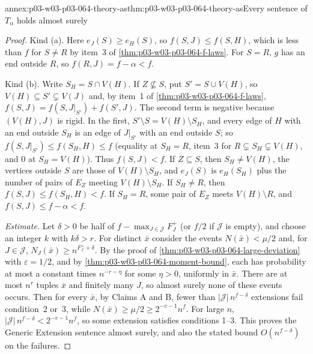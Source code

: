 \begin{annexitem}{annex:p03-w03-p03-064-theory-as}{thm:p03-w03-p03-064-theory-as}{Every sentence of \(T_\alpha\) holds almost surely}
\begin{proof}
Kind (a).  Here \(e_J(S)\geq e_H(S)\), so \(f(S,J)\leq f(S,H)\), which is
less than \(f\) for \(S\neq R\) by item~3 of
\cref{thm:p03-w03-p03-064-f-laws}.  For \(S=R\), \(g\) has an end outside
\(R\), so \(f(R,J)=f-\alpha<f\).

Kind (b).  Write \(S_H=S\cap V(H)\).  If \(Z\not\subseteq S\), put
\(S'=S\cup V(H)\), so \(V(H)\subseteq S'\subsetneq V(J)\) and, by item~1 of
\cref{thm:p03-w03-p03-064-f-laws},
\(f(S,J)=f(S,J|_{S'})+f(S',J)\).  The second term is negative because
\((V(H),J)\) is rigid.  In the first, \(S'\setminus S=V(H)\setminus S_H\),
and every edge of \(H\) with an end outside \(S_H\) is an edge of
\(J|_{S'}\) with an end outside \(S\); so \(f(S,J|_{S'})\leq f(S_H,H)\leq f\)
(equality at \(S_H=R\), item~3 for \(R\subsetneq S_H\subsetneq V(H)\), and
\(0\) at \(S_H=V(H)\)).  Thus \(f(S,J)<f\).  If \(Z\subseteq S\), then
\(S_H\neq V(H)\), the vertices outside \(S\) are those of
\(V(H)\setminus S_H\), and \(e_J(S)\) is \(e_H(S_H)\) plus the number of
pairs of \(E_Z\) meeting \(V(H)\setminus S_H\).  If \(S_H\neq R\), then
\(f(S,J)\leq f(S_H,H)<f\).  If \(S_H=R\), some pair of \(E_Z\) meets
\(V(H)\setminus R\), and \(f(S,J)\leq f-\alpha<f\).

\emph{Estimate.}  Let \(\delta>0\) be half of \(f-\max_{J\in\mathcal J}F^+_J\)
(or \(f/2\) if \(\mathcal J\) is empty), and choose an integer \(k\) with
\(k\delta>r\).  For distinct \(\bar x\) consider the events
\(N(\bar x)<\mu/2\) and, for \(J\in\mathcal J\),
\(N_J(\bar x)\geq n^{F^+_J+\delta}\).  By the proof of
\cref{thm:p03-w03-p03-064-large-deviation} with \(\varepsilon=1/2\), and by
\cref{thm:p03-w03-p03-064-moment-bound}, each has probability at most a
constant times \(n^{-r-\eta}\) for some \(\eta>0\), uniformly in \(\bar x\).
There are at most \(n^r\) tuples \(\bar x\) and finitely many \(J\), so
almost surely none of these events occurs.  Then for every \(\bar x\), by
Claims A and B, fewer than \(|\mathcal J|\,n^{f-\delta}\) extensions fail
condition~2 or~3, while \(N(\bar x)\geq\mu/2\geq2^{-v-1}n^f\).  For large
\(n\), \(|\mathcal J|\,n^{f-\delta}<2^{-v-1}n^f\), so some extension satisfies
conditions 1--3.  This proves the Generic Extension sentence almost surely,
and also the stated bound \(O(n^{f-\delta})\) on the failures.
\end{proof}
\end{annexitem}

